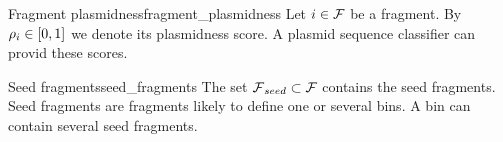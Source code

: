 \begin{definition}{Fragment plasmidness}{fragment_plasmidness}
  Let \(i \in \mathcal{F}{}\) be a fragment.
  By \(\rho_{i} \in [0, 1]\) we denote its plasmidness score.
  A plasmid sequence classifier can provid these scores.
\end{definition}

\begin{definition}{Seed fragments}{seed_fragments}
  The set \(\mathcal{F}{}_{seed}{} \subset \mathcal{F}{}\) contains the seed fragments.
  Seed fragments are fragments likely to define one or several bins.
  A bin can contain several seed fragments.
\end{definition}